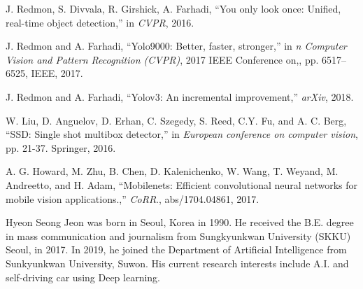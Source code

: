 \documentclass{ieeeaccess}
\begin{document}
\begin{thebibliography}{00}

 J. Redmon, S. Divvala, R. Girshick, A. Farhadi, ``You only look once: Unified, real-time object detection,'' in \emph{CVPR}, 2016.

 J. Redmon and A. Farhadi, ``Yolo9000: Better, faster, stronger,'' in \emph{n Computer Vision and Pattern Recognition (CVPR)},  2017 IEEE Conference on,, pp. 6517–6525, IEEE, 2017.

 J. Redmon and A. Farhadi, ``Yolov3: An incremental improvement,'' \emph{arXiv}, 2018.

 W. Liu, D. Anguelov, D. Erhan, C. Szegedy, S. Reed, C.Y. Fu, and A. C. Berg, ``SSD: Single shot multibox detector,'' in \emph{European conference on computer vision}, pp. 21-37. Springer, 2016.

 A. G. Howard, M. Zhu, B. Chen, D. Kalenichenko, W. Wang, T. Weyand, M. Andreetto, and H. Adam, ``Mobilenets: Efficient convolutional neural networks for mobile vision applications.,'' \emph{CoRR}., abs/1704.04861, 2017.

\end{thebibliography}

\begin{IEEEbiography}{Hyeon Seong Jeon}
was born in Seoul, Korea in 1990. He received the B.E. degree in mass communication and journalism from Sungkyunkwan University (SKKU) Seoul, in 2017. In 2019, he joined the Department of Artificial Intelligence from Sunkyunkwan University, Suwon. His current research interests include A.I. and self-driving car using Deep learning.
\end{IEEEbiography}



\EOD
\end{document}
